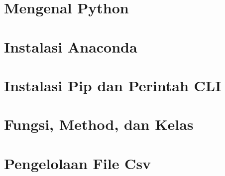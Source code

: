 \documentclass{wileySix}
\begin{document}
\begin{introduction}

\end{introduction}

\chapter{Mengenal Python}


\chapter{Instalasi Anaconda}


\chapter{Instalasi Pip dan Perintah CLI}


\chapter{Fungsi, Method, dan Kelas}


\chapter{Pengelolaan File Csv}


%

%

%

%

%
\end{document}
